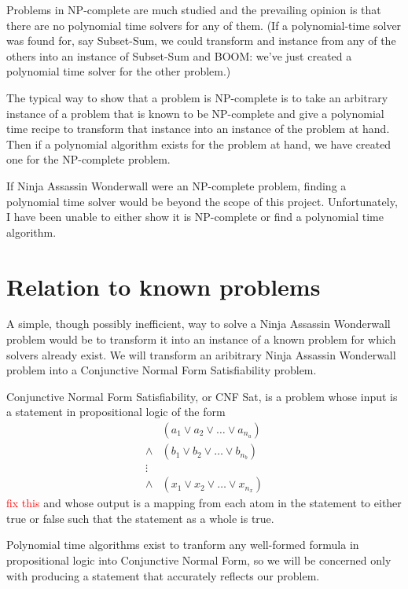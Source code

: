 \documentclass[12pt]{article}
\begin{document}
Problems in NP-complete are much studied and the prevailing opinion is that there are no polynomial time solvers for any of them. (If a polynomial-time solver was found for, say Subset-Sum, we could transform and instance from any of the others into an instance of Subset-Sum and BOOM: we've just created a polynomial time solver for the other problem.)

The typical way to show that a problem is NP-complete is to take an arbitrary instance of a problem that is known to be NP-complete and give a polynomial time recipe to transform that instance into an instance of the problem at hand. Then if a polynomial algorithm exists for the problem at hand, we have created one for the NP-complete problem. 

If Ninja Assassin Wonderwall were an NP-complete problem, finding a polynomial time solver would be beyond the scope of this project. Unfortunately, I have been unable to either show it is NP-complete or find a polynomial time algorithm. 

\section{Relation to known problems}
A simple, though possibly inefficient, way to solve a Ninja Assassin Wonderwall problem would be to transform it into an instance of a known problem for which solvers already exist. We will transform an aribitrary Ninja Assassin Wonderwall problem into a Conjunctive Normal Form Satisfiability problem.

Conjunctive Normal Form Satisfiability, or CNF Sat, is a problem whose input is a statement in propositional logic of the form
    \begin{align*} 
                & (a_1 \vee a_2 \vee \ldots \vee a_{n_a}) \\
        \wedge  & (b_1 \vee b_2 \vee \ldots \vee b_{n_b})\\
        \vdots  &\\
        \wedge  & (x_1 \vee x_2 \vee \ldots \vee x_{n_x})
    \end{align*} \textcolor{red}{fix this}
and whose output is a mapping from each atom in the statement to either true or false such that the statement as a whole is true. 

Polynomial time algorithms exist to tranform any well-formed formula in propositional logic into Conjunctive Normal Form, so we will be concerned only with producing a statement that accurately reflects our problem.
\end{document}
